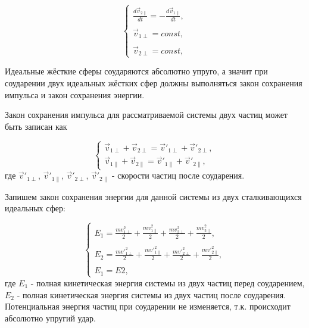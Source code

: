 \documentclass{article}
\begin{document}
\begin{equation}\label{eq:velocities_and_forces_for_two_particles2}
    \begin{cases}
        \displaystyle\frac{d\vec{v}_{2\parallel}}{dt} = -\displaystyle\frac{d\vec{v}_{1\parallel}}{dt},
        \\
        \\
        \vec{v}_{1\perp} = const,
        \\
        \\
        \vec{v}_{2\perp} = const,
    \end{cases}
\end{equation}

Идеальные жёсткие сферы соударяются абсолютно упруго, а значит при соударении двух идеальных жёстких сфер должны выполняться закон сохранения импульса и закон сохранения энергии.

Закон сохранения импульса для рассматриваемой системы двух частиц  может быть записан как

\begin{equation}\label{eq:rule_of_contant_impulse}
    \begin{cases}
        \vec{v}_{1\perp} + \vec{v}_{2\perp} = \vec{v}'_{1\perp} + \vec{v}'_{2\perp},
        \\
        \vec{v}_{1\parallel} + \vec{v}_{2\parallel} = \vec{v}'_{1\parallel} + \vec{v}'_{2\parallel},
    \end{cases}
\end{equation}
где $ \vec{v}'_{1\perp} $, $ \vec{v}'_{1\parallel} $, $ \vec{v}'_{2\perp} $, $ \vec{v}'_{2\parallel} $ - скорости частиц после соударения.

Запишем закон сохранения энергии для данной системы из двух сталкивающихся идеальных сфер:

\begin{equation}\label{eq:rule_of_contant_energy}
    \begin{cases}
        E_1 = \displaystyle\frac{mv^2_{1\perp}}{2} + \displaystyle\frac{mv^2_{1\parallel}}{2} + \displaystyle\frac{mv^2_{2\perp}}{2} + \displaystyle\frac{mv^2_{2\parallel}}{2},
        \\
        \\
        E_2 = \displaystyle\frac{mv'^2_{1\perp}}{2} + \displaystyle\frac{mv'^2_{1\parallel}}{2} + \displaystyle\frac{mv'^2_{2\perp}}{2} + \displaystyle\frac{mv'^2_{2\parallel}}{2},
        \\
        \\
        E_1 = E2,
    \end{cases}
\end{equation}
где $ E_1 $ - полная кинетическая энергия системы из двух частиц перед соударением, $ E_2 $ - полная кинетическая энергия системы из двух частиц после соударения. Потенциальная энергия частиц при соударении не изменяется, т.к. происходит абсолютно упругий удар.
\end{document}
